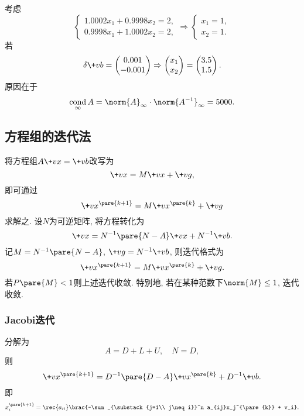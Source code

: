 \documentclass[hidelinks]{ctexart}
\DeclareMathOperator{\cond}{cond}
\begin{document}
\begin{ex}
    考虑
    \[ \begin{cases}
        1.0002x_1 + 0.9998x_2 = 2,\\
        0.9998x_1 + 1.0002x_2 = 2,
    \end{cases} \Rightarrow \begin{cases}
        x_1 = 1,\\
        x_2 = 1.
    \end{cases} \]
    若
    \[ \delta \+vb = \begin{pmatrix}
        0.001 \\
        -0.001
    \end{pmatrix} \Rightarrow \begin{pmatrix}
        x_1\\ x_2
    \end{pmatrix} = \begin{pmatrix}
        3.5 \\ 1.5
    \end{pmatrix}. \]
    原因在于
    \[ \cond_\infty A = \norm{A}_\infty \cdot \norm{A^{-1}}_\infty = 5000. \]
\end{ex}



\subsection{方程组的迭代法} %
\label{sub:方程组的迭代法}

将方程组$A\+vx=\+vb$改写为
\[ \+vx = M\+vx + \+vg, \]
即可通过
\[ \+vx^{\pare{k+1}} = M\+vx^{\pare{k}}+\+vg \]
求解之. 设$N$为可逆矩阵, 将方程转化为
\[ \+vx = N^{-1}\pare{N-A}\+vx + N^{-1}\+vb. \]
记$M = N^{-1}\pare{N-A}$, $\+vg = N^{-1}\+vb$, 则迭代格式为
\[ \+vx^{\pare{k+1}} = M\+vx^{\pare{k}}+\+vg. \]
若$P\pare{M} < 1$则上述迭代收敛. 特别地, 若在某种范数下$\norm{M} \le 1$, 迭代收敛.

\subsubsection{Jacobi迭代} %
\label{ssub:jacobi迭代}

分解为
\[ A = D+L+U,\quad N = D, \]
则
\[ \+vx^{\pare{k+1}} = D^{-1}\pare{D-A}\+vx^{\pare{k}} + D^{-1}\+vb. \]
即
\[ x^{\pare{k+1}}_i = \rec{a_{ii}}\brac{-\sum_{\substack{j=1\\ j\neq i}}^n a_{ij}x_j^{\pare{k}} + v_i}. \]
\end{document}
